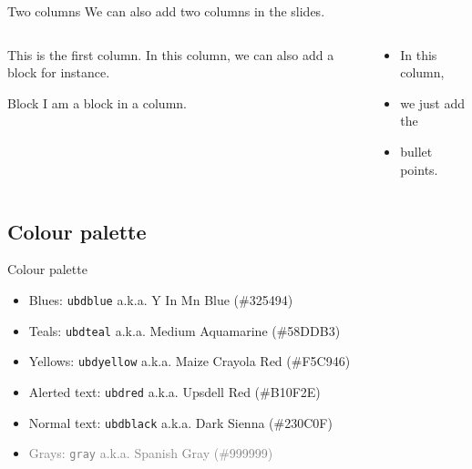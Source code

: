 \documentclass[,aspectratio=43]{beamer}
\providecommand{\tightlist}{%
  \setlength{\itemsep}{0pt}\setlength{\parskip}{0pt}}
\begin{document}
\begin{frame}{Two columns}
\protect\hypertarget{two-columns}{}
We can also add two columns in the slides.\bigskip

\begin{columns}[T]
\begin{column}{0.48\textwidth}
This is the first column. In this column, we can also add a block for
instance.

\begin{block}{Block}
\protect\hypertarget{block}{}
I am a block in a column.
\end{block}
\end{column}

\begin{column}{0.48\textwidth}
\begin{itemize}
\tightlist
\item
  In this column,
\item
  we just add the
\item
  bullet points.
\end{itemize}
\end{column}
\end{columns}
\end{frame}

\hypertarget{colour-palette}{%
\subsection{Colour palette}\label{colour-palette}}

\begin{frame}[fragile]{Colour palette}
\begin{itemize}
\tightlist
\item
  \textcolor{ubdblue}{Blues: \texttt{ubdblue} a.k.a. Y In Mn Blue
  (\#325494)}
\item
  \textcolor{ubdteal}{Teals: \texttt{ubdteal} a.k.a. Medium Aquamarine
  (\#58DDB3)}
\item
  \textcolor{ubdyellow}{Yellows: \texttt{ubdyellow} a.k.a. Maize Crayola
  Red (\#F5C946)}
\item
  \textcolor{ubdred}{Alerted text: \texttt{ubdred} a.k.a. Upsdell Red
  (\#B10F2E)}
\item
  \textcolor{ubdblack}{Normal text: \texttt{ubdblack} a.k.a. Dark Sienna
  (\#230C0F)}
\item
  \textcolor{gray}{Grays: \texttt{gray} a.k.a. Spanish Gray (\#999999)}
\end{itemize}

\end{frame}
\end{document}
